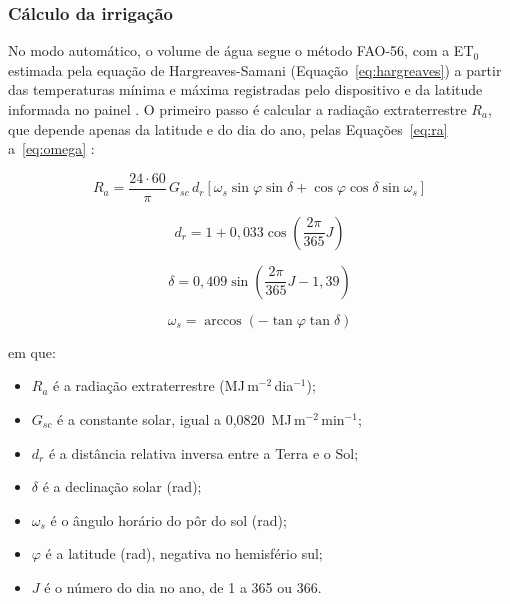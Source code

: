 \subsubsection{Cálculo da irrigação}
\label{subsec:calculo}

No modo automático, o volume de água segue o método FAO-56, com a ET$_0$ estimada pela equação de Hargreaves-Samani (Equação~\ref{eq:hargreaves}) a partir das temperaturas mínima e máxima registradas pelo dispositivo e da latitude informada no painel \cite{allen1998,hargreaves1985}. O primeiro passo é calcular a radiação extraterrestre $R_a$, que depende apenas da latitude e do dia do ano, pelas Equações~\ref{eq:ra} a~\ref{eq:omega} \cite{allen1998}:

\begin{equation}
  R_a = \frac{24 \cdot 60}{\pi}\, G_{sc}\, d_r \left[\omega_s \sin\varphi \sin\delta + \cos\varphi \cos\delta \sin\omega_s\right]
  \label{eq:ra}
\end{equation}

\begin{equation}
  d_r = 1 + 0{,}033 \cos\!\left(\frac{2\pi}{365} J\right)
  \label{eq:dr}
\end{equation}

\begin{equation}
  \delta = 0{,}409 \sin\!\left(\frac{2\pi}{365} J - 1{,}39\right)
  \label{eq:delta}
\end{equation}

\begin{equation}
  \omega_s = \arccos\left(-\tan\varphi \tan\delta\right)
  \label{eq:omega}
\end{equation}

\noindent em que:
\begin{itemize}
  \item $R_a$ é a radiação extraterrestre (MJ\,m$^{-2}$\,dia$^{-1}$);
  \item $G_{sc}$ é a constante solar, igual a 0,0820~MJ\,m$^{-2}$\,min$^{-1}$;
  \item $d_r$ é a distância relativa inversa entre a Terra e o Sol;
  \item $\delta$ é a declinação solar (rad);
  \item $\omega_s$ é o ângulo horário do pôr do sol (rad);
  \item $\varphi$ é a latitude (rad), negativa no hemisfério sul;
  \item $J$ é o número do dia no ano, de 1 a 365 ou 366.
\end{itemize}

